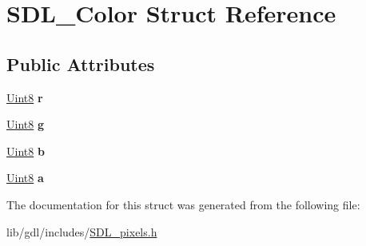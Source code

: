 \hypertarget{struct_s_d_l___color}{}\section{S\+D\+L\+\_\+\+Color Struct Reference}
\label{struct_s_d_l___color}
\subsection*{Public Attributes}
\begin{DoxyCompactItemize}
\item 
\hypertarget{struct_s_d_l___color_a0bb975b6829524133fdd3c6060cfa63d}{}\hyperlink{_s_d_l__stdinc_8h_a2944638813a090aa23e62f4da842c3e2}{Uint8} {\bfseries r}\label{struct_s_d_l___color_a0bb975b6829524133fdd3c6060cfa63d}

\item 
\hypertarget{struct_s_d_l___color_ae29d881bf740cfa7078b36e07f85d298}{}\hyperlink{_s_d_l__stdinc_8h_a2944638813a090aa23e62f4da842c3e2}{Uint8} {\bfseries g}\label{struct_s_d_l___color_ae29d881bf740cfa7078b36e07f85d298}

\item 
\hypertarget{struct_s_d_l___color_a3b79a27e0414049559aa5bcf241dedd3}{}\hyperlink{_s_d_l__stdinc_8h_a2944638813a090aa23e62f4da842c3e2}{Uint8} {\bfseries b}\label{struct_s_d_l___color_a3b79a27e0414049559aa5bcf241dedd3}

\item 
\hypertarget{struct_s_d_l___color_ac497ba67af6ecb4d51bdd0945b314526}{}\hyperlink{_s_d_l__stdinc_8h_a2944638813a090aa23e62f4da842c3e2}{Uint8} {\bfseries a}\label{struct_s_d_l___color_ac497ba67af6ecb4d51bdd0945b314526}

\end{DoxyCompactItemize}


The documentation for this struct was generated from the following file\+:\begin{DoxyCompactItemize}
\item 
lib/gdl/includes/\hyperlink{_s_d_l__pixels_8h}{S\+D\+L\+\_\+pixels.\+h}\end{DoxyCompactItemize}
